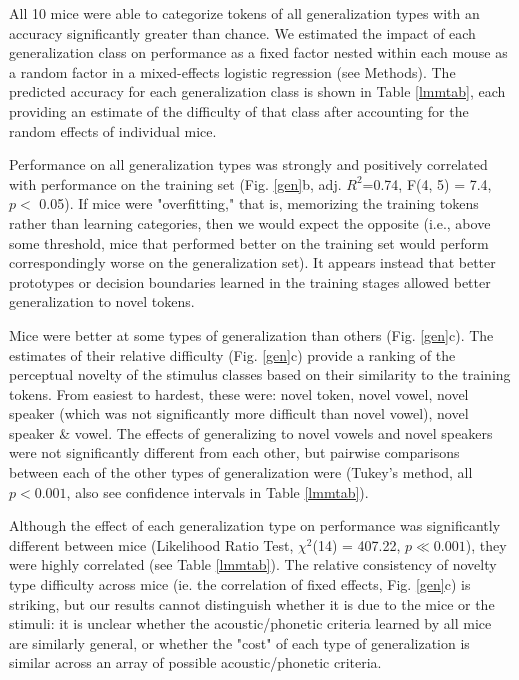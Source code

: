 \documentclass[preprint, NumberedRefs]{JASAnew}\usepackage[]{graphicx}\usepackage[]{color}
\begin{document}
All 10 mice were able to categorize tokens of all generalization types with an accuracy significantly greater than chance. We estimated the impact of each generalization class on performance as a fixed factor nested within each mouse as a random factor in a mixed-effects logistic regression (see Methods). The predicted accuracy for each generalization class is shown in Table \ref{lmmtab}, each providing an estimate of the difficulty of that class after accounting for the random effects of individual mice.

Performance on all generalization types was strongly and positively correlated with performance on the training set (Fig. \ref{gen}b, adj. $R^2$=0.74, F(4, 5) = 7.4, $p <$ 0.05). If mice were "overfitting," that is, memorizing the training tokens rather than learning categories, then we would expect the opposite (i.e., above some threshold, mice that performed better on the training set would perform correspondingly worse on the generalization set). It appears instead that better prototypes or decision boundaries learned in the training stages allowed better generalization to novel tokens.

Mice were better at some types of generalization than others (Fig. \ref{gen}c). The estimates of their relative difficulty (Fig. \ref{gen}c) provide a ranking of the perceptual novelty of the stimulus classes based on their similarity to the training tokens. From easiest to hardest, these were: novel token, novel vowel, novel speaker (which was not significantly more difficult than novel vowel), novel speaker \& vowel. The effects of generalizing to novel vowels and novel speakers were not significantly different from each other, but pairwise comparisons between each of the other types of generalization were (Tukey's method, all $p < 0.001$, also see confidence intervals in Table \ref{lmmtab}).

Although the effect of each generalization type on performance was significantly different between mice (Likelihood Ratio Test, $\chi^2$(14) = 407.22, $p \ll 0.001$), they were highly correlated (see Table \ref{lmmtab}). The relative consistency of novelty type difficulty across mice (ie. the correlation of fixed effects, Fig. \ref{gen}c) is striking, but our results cannot distinguish whether it is due to the mice or the stimuli: it is unclear whether the acoustic/phonetic criteria learned by all mice are similarly general, or whether the "cost" of each type of generalization is similar across an array of possible acoustic/phonetic criteria.
\end{document}
